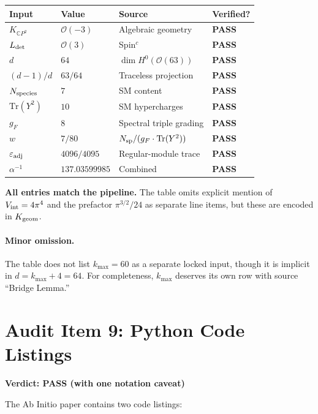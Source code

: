 \documentclass[11pt]{article}
\newcommand{\PASS}{\textcolor{pass}{\textbf{PASS}}}
\begin{document}
\begin{center}
\renewcommand{\arraystretch}{1.2}
\begin{tabular}{llll}
\toprule
Input & Value & Source & Verified? \\
\midrule
$K_{\mathbb{C}P^2}$ & $\mathcal{O}(-3)$ & Algebraic geometry & \PASS \\
$L_{\rm det}$ & $\mathcal{O}(3)$ & Spin$^c$ & \PASS \\
$d$ & $64$ & $\dim H^0(\mathcal{O}(63))$ & \PASS \\
$(d-1)/d$ & $63/64$ & Traceless projection & \PASS \\
$N_{\rm species}$ & $7$ & SM content & \PASS \\
$\mathrm{Tr}(Y^2)$ & $10$ & SM hypercharges & \PASS \\
$g_F$ & $8$ & Spectral triple grading & \PASS \\
$w$ & $7/80$ & $N_{\rm sp}/(g_F \cdot \mathrm{Tr}(Y^2))$ & \PASS \\
$\varepsilon_{\rm adj}$ & $4096/4095$ & Regular-module trace & \PASS \\
$\alpha^{-1}$ & $137.03599985$ & Combined & \PASS \\
\bottomrule
\end{tabular}
\end{center}

\textbf{All entries match the pipeline.} The table omits explicit mention of
$V_{\rm int} = 4\pi^4$ and the prefactor $\pi^{3/2}/24$ as separate line items,
but these are encoded in $K_{\rm geom}$.

\paragraph{Minor omission.}
The table does not list $k_{\max} = 60$ as a separate locked input, though
it is implicit in $d = k_{\max} + 4 = 64$. For completeness, $k_{\max}$
deserves its own row with source ``Bridge Lemma.''

\section{Audit Item 9: Python Code Listings}

\textbf{Verdict: \PASS{} (with one notation caveat)}

\medskip
The Ab Initio paper contains two code listings:
\end{document}
